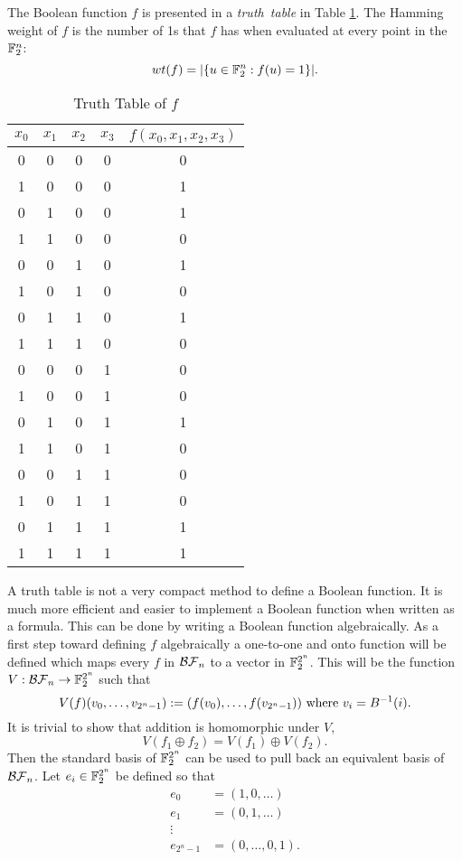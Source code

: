 \par The Boolean function $f$ is presented in a {\em truth\ table} in 
Table \ref{tab:truth-table}. The Hamming weight of $f$ is the number of 1s
that $f$ has when evaluated at every point in the $\mathbb{F}_2^n$: 
\[
wt(f)=\lvert\{u\in\mathbb{F}_2^n:f(u)=1\}\rvert.
\]
\begin{table}
\label{tab:truth-table}
	\centering
  \begin{tabular}{|c|c|c|c||c|}
    \hline
    $x_0$&$x_1$&$x_2$&$x_3$&$f(x_0,x_1,x_2,x_3)$\\
    \hline
    0&0&0&0&0\\
    1&0&0&0&1\\
    0&1&0&0&1\\
    1&1&0&0&0\\
    0&0&1&0&1\\
    1&0&1&0&0\\
    0&1&1&0&1\\
    1&1&1&0&0\\
    0&0&0&1&0\\
    1&0&0&1&0\\
    0&1&0&1&1\\
    1&1&0&1&0\\
    0&0&1&1&0\\
    1&0&1&1&0\\
    0&1&1&1&1\\
    1&1&1&1&1\\
  	\hline
	\end{tabular}
	\caption{Truth Table of $f$}
\end{table}
\par A truth table is not a very compact method to define a Boolean
function. It is much more efficient and easier to implement a Boolean
function when written as a formula. This can be done by writing a Boolean
function algebraically. As a first step toward defining $f$ algebraically a
one-to-one and onto function will be defined which maps every $f$ in
$\mathcal{BF}_n$ to a vector in $\mathbb{F}_2^{2^n}$. This will be the function
$V:\mathcal{BF}_n\rightarrow\mathbb{F}_2^{2^n}$ such that
\begin{equation}\label{eqn:bool-vector}
	V(f)(v_0,\dots,v_{2^n-1}):=(f(v_0),\dots,f(v_{2^n-1}))\ {\rm where\ } v_i=B^{-1}(i).
\end{equation}
It is trivial to show that addition is homomorphic under $V$,
\[
V(f_1\oplus f_2)=V(f_1)\oplus V(f_2).
\]
Then the standard basis of $\mathbb{F}_2^{2^n}$ can be used to pull back an equivalent basis
of $\mathcal{BF}_n$. Let $e_i\in\mathbb{F}_2^{2^n}$ be defined so that
\begin{align*}
	e_0&=(1,0,\dots)\\
	e_1&=(0,1,\dots)\\
	\vdots \\
	e_{2^n-1}&=(0,\dots,0,1).
\end{align*}

